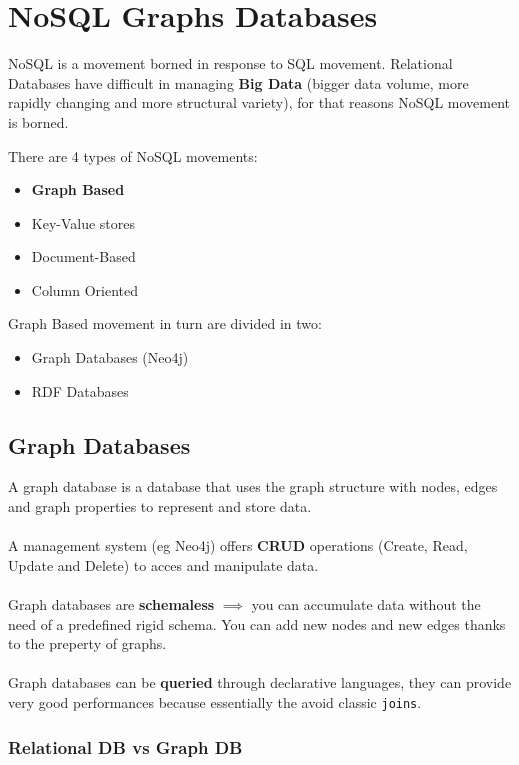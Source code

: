 \chapter{NoSQL Graphs Databases}

NoSQL is a movement borned in response to SQL movement. 
Relational Databases have difficult in managing \textbf{Big Data} (bigger data volume, more rapidly changing and more structural variety), for that reasons NoSQL movement is borned. 

There are 4 types of NoSQL movements: 
\begin{itemize}
    \item \textbf{Graph Based}
    \item Key-Value stores
    \item Document-Based
    \item Column Oriented
\end{itemize}

Graph Based movement in turn are divided in two: 
\begin{itemize}
    \item Graph Databases (Neo4j)
    \item RDF Databases
\end{itemize}

\section{Graph Databases}

A graph database is a database that uses the graph structure with nodes, edges and graph properties to represent and store data. \\
\\
A management system (eg Neo4j) offers \textbf{CRUD} operations (Create, Read, Update and Delete) to acces and manipulate data.\\
\\
Graph databases are \textbf{schemaless} $\implies$ you can accumulate data without the need of a predefined rigid schema. You can add new nodes and new edges thanks to the preperty of graphs. \\
\\
Graph databases can be \textbf{queried} through declarative languages, they can provide very good performances because essentially the avoid classic \texttt{joins}. 

\newpage
\subsection*{Relational DB vs Graph DB}

